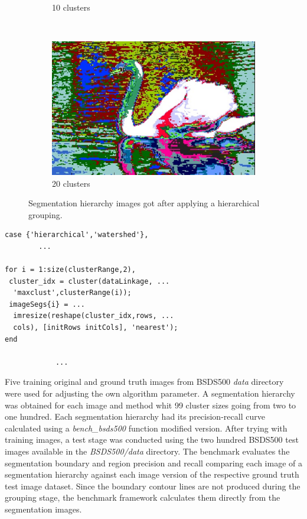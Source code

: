 \documentclass[10pt,twocolumn,letterpaper]{article}
\begin{document}
\begin{figure}
\begin{subfigure}[b]{0.2\textwidth}
        \caption{10 clusters}
        \label{fig:clust10}
    \end{subfigure}
    ~ 
    \begin{subfigure}[b]{0.2\textwidth}
        \includegraphics[width=\textwidth]{8068Hier20.eps}
        \caption{20 clusters}
        \label{fig:clust20}
    \end{subfigure}
   \caption{Segmentation hierarchy images got after applying a hierarchical grouping.}
   \label{fig:hierarchy}
\end{figure}

\begin{verbatim}
case {'hierarchical','watershed'},
		...            
            
for i = 1:size(clusterRange,2),
 cluster_idx = cluster(dataLinkage, ...
  'maxclust',clusterRange(i));
 imageSegs{i} = ...
  imresize(reshape(cluster_idx,rows, ...
  cols), [initRows initCols], 'nearest');
end
            
            ...
\end{verbatim}


Five training original and ground truth images from BSDS500 \textit{data} directory were used for adjusting the own algorithm parameter. A segmentation hierarchy was obtained for each image and method whit 99 cluster sizes going from two to one hundred. Each segmentation hierarchy had its precision-recall curve calculated using a \textit{bench\_bsds500} function modified version. After trying with training images, a test stage was conducted using the two hundred BSDS500 test images available in the \textit{BSDS500/data} directory. The benchmark evaluates the segmentation boundary and region precision and recall comparing each image of a segmentation hierarchy against each image version of the respective ground truth test image dataset. Since the boundary contour lines are not produced during the grouping stage, the benchmark framework calculates them directly from the segmentation images.
\end{document}
